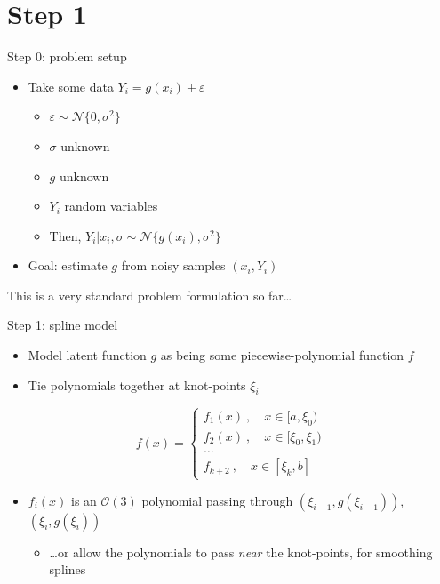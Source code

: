 \documentclass[presentation]{beamer}
\begin{document}
\section{Step 1}
\label{sec:org5de6c2a}
\begin{frame}[label={sec:orgb61b9e9}]{Step 0: problem setup}
\begin{itemize}
\item Take some data \(Y_i = g(x_i) + \varepsilon\)
\begin{itemize}
\item \(\varepsilon\sim\mathcal{N}\{0, \sigma^2\}\)
\item \(\sigma\) unknown
\item \(g\) unknown
\item \(Y_i\) random variables
\item Then, \(Y_i|x_i, \sigma\sim\mathcal{N}\{g(x_i), \sigma^2\}\)
\end{itemize}
\end{itemize}
\vfill
\begin{itemize}
\item Goal: estimate \(g\) from noisy samples \((x_i, Y_i)\)
\end{itemize}
\vfill
This is a very standard problem formulation so far\ldots{}
\end{frame}

\begin{frame}[label={sec:org5205e06}]{Step 1: spline model}
\begin{itemize}
\item Model latent function \(g\) as being some piecewise-polynomial function \(f\)
\item Tie polynomials together at knot-points \(\xi_i\)
\end{itemize}

\begin{equation}
f(x) = 
    \begin{cases}
        f_1(x)~, \quad x\in[a,\xi_0)\\
	f_2(x)~, \quad x\in[\xi_0, \xi_1)\\
	\dots \\
	f_{k+2}~,\quad x\in[\xi_k, b]
    \end{cases}
\end{equation}

\begin{itemize}
\item \(f_i(x)\) is an \(\mathcal{O}(3)\) polynomial passing through \((\xi_{i-1},g(\xi_{i-1}))\), \((\xi_i, g(\xi_i))\)
\begin{itemize}
\item \ldots{}or allow the polynomials to pass \emph{near} the knot-points, for smoothing splines
\end{itemize}
\end{itemize}
\end{frame}
\end{document}
